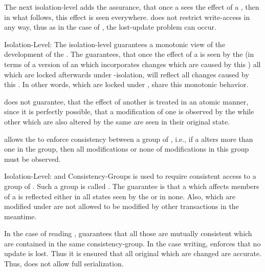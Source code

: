 \documentclass[a4paper, 12pt]{book}
\begin{document}
The next isolation-level adds the assurance, that once a  sees
the effect of a , then in what follows, this effect is seen
everywhere. \isoMONOTONICITY does not restrict write-access in any way, thus
as in the case of \isoCOMMITTED, the lost-update problem can occur. 
%
\begin{definition*}{Isolation-Level: \isoMONOTONICITY}
  The isolation-level \isoMONOTONICITY guarantees a monotonic view of the
  development of the . The \SYNEIGHT guarantees, that once the
  effect of a  is seen by the  (in terms of a
  version of an  which incorporates changes which are caused by
  this ) all  which are locked afterwards
  under \isoMONOTONICITY-isolation, will reflect all changes caused by this
  .
  In other words,  which are locked under \isoMONOTONICITY,
  share this monotonic behavior.
\end{definition*}
%
\isoMONOTONICITY does not guarantee, that the effect of another
 is treated in an atomic manner, since it is perfectly
possible, that a  modification of one  is
observed by the  while other  which are also
altered by the same  are seen in their original state.

\isoCONSISTENT allows the  to enforce consistency between a group of
, i.e., if a  alters more than one  in
the group, then all modifications or none of modifications in this group must
be observed.
%
\begin{definition*}{Isolation-Level: \isoCONSISTENT and Consistency-Groups}
  \isoCONSISTENT is used to require consistent access to a group of
  . Such a group is called . The guarantee
  is that a  which affects members of a 
  is reflected either in all states seen by the  or in none.
  Also,  which are modified under \isoCONSISTENT are not allowed
  to be modified by other transactions in the meantime. 
\end{definition*}
%
In the case of reading , \isoCONSISTENT guarantees that
all those  are mutually consistent which are contained in
the same consistency-group.
%
In the case writing, \isoCONSISTENT enforces that no update is lost.
Thus it is ensured that all original  which are
changed are accurate. 
%
Thus, \isoCONSISTENT does not allow full serialization.
\end{document}
